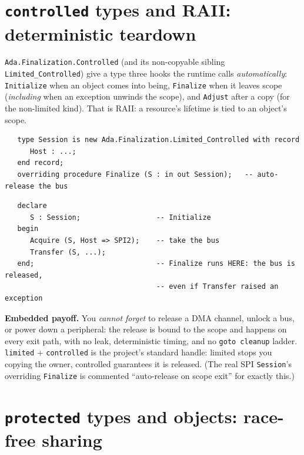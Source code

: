 \section{\texttt{controlled} types and RAII: deterministic teardown}

\texttt{Ada.Finalization.Controlled} (and its non-copyable sibling
\texttt{Limited\_Controlled}) give a type three hooks the runtime calls
\emph{automatically}: \texttt{Initialize} when an object comes into being,
\texttt{Finalize} when it leaves scope (\emph{including} when an exception unwinds
the scope), and \texttt{Adjust} after a copy (for the non-limited kind). That is
RAII: a resource's lifetime is tied to an object's scope.

\begin{lstlisting}
   type Session is new Ada.Finalization.Limited_Controlled with record
      Host : ...;
   end record;
   overriding procedure Finalize (S : in out Session);   -- auto-release the bus
\end{lstlisting}

\begin{lstlisting}
   declare
      S : Session;                  -- Initialize
   begin
      Acquire (S, Host => SPI2);    -- take the bus
      Transfer (S, ...);
   end;                             -- Finalize runs HERE: the bus is released,
                                    -- even if Transfer raised an exception
\end{lstlisting}

\textbf{Embedded payoff.} You \emph{cannot forget} to release a DMA channel,
unlock a bus, or power down a peripheral: the release is bound to the scope and
happens on every exit path, with no leak, deterministic timing, and no
\texttt{goto cleanup} ladder. \texttt{limited} + \texttt{controlled} is the
project's standard handle: limited stops you copying the owner, controlled
guarantees it is released. (The real SPI \texttt{Session}'s overriding
\texttt{Finalize} is commented ``auto-release on scope exit'' for exactly this.)


\section{\texttt{protected} types and objects: race-free sharing}

